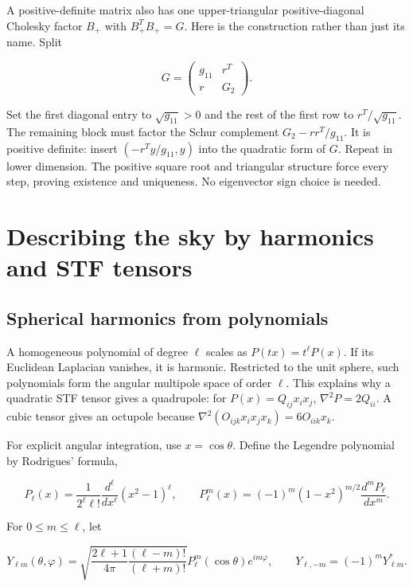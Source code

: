 \documentclass[
  11pt,
  a4paper]{article}
\begin{document}
A positive-definite matrix also has one upper-triangular positive-diagonal Cholesky factor \(B_+\) with \(B_+^TB_+=G\). Here is the construction rather than just its name. Split

\[
G=\begin{pmatrix}g_{11}&r^T\\r&G_2\end{pmatrix}.
\]

Set the first diagonal entry to \(\sqrt{g_{11}}>0\) and the rest of the first row to \(r^T/\sqrt{g_{11}}\). The remaining block must factor the Schur complement \(G_2-rr^T/g_{11}\). It is positive definite: insert \((-r^Ty/g_{11},y)\) into the quadratic form of \(G\). Repeat in lower dimension. The positive square root and triangular structure force every step, proving existence and uniqueness. No eigenvector sign choice is needed.

\hypertarget{describing-the-sky-by-harmonics-and-stf-tensors}{%
\section{Describing the sky by harmonics and STF tensors}\label{describing-the-sky-by-harmonics-and-stf-tensors}}

\hypertarget{spherical-harmonics-from-polynomials}{%
\subsection{Spherical harmonics from polynomials}\label{spherical-harmonics-from-polynomials}}

A homogeneous polynomial of degree \(\ell\) scales as \(P(tx)=t^\ell P(x)\). If its Euclidean Laplacian vanishes, it is harmonic. Restricted to the unit sphere, such polynomials form the angular multipole space of order \(\ell\). This explains why a quadratic STF tensor gives a quadrupole: for \(P(x)=Q_{ij}x_ix_j\), \(\nabla^2P=2Q_{ii}\). A cubic tensor gives an octupole because \(\nabla^2(O_{ijk}x_ix_jx_k)=6O_{iik}x_k\).

For explicit angular integration, use \(x=\cos\theta\). Define the Legendre polynomial by Rodrigues' formula,

\[
P_\ell(x)=\frac1{2^\ell\ell!}\frac{d^\ell}{dx^\ell}(x^2-1)^\ell,
\qquad
P_\ell^m(x)=(-1)^m(1-x^2)^{m/2}\frac{d^mP_\ell}{dx^m}.
\tag{3.1}
\]

For \(0\le m\le\ell\), let

\[
Y_{\ell m}(\theta,\varphi)
=\sqrt{\frac{2\ell+1}{4\pi}\frac{(\ell-m)!}{(\ell+m)!}}
P_\ell^m(\cos\theta)e^{im\varphi},
\qquad
Y_{\ell,-m}=(-1)^mY_{\ell m}^*.
\tag{3.2}
\]
\end{document}

